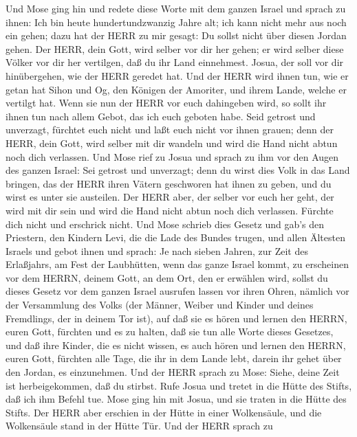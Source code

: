  Und Mose ging hin und redete diese Worte mit dem ganzen
Israel  und sprach zu ihnen: Ich bin heute hundertundzwanzig
Jahre alt; ich kann nicht mehr aus noch ein gehen; dazu hat der HERR zu
mir gesagt: Du sollst nicht über diesen Jordan gehen.  Der
HERR, dein Gott, wird selber vor dir her gehen; er wird selber diese
Völker vor dir her vertilgen, daß du ihr Land einnehmest. Josua, der
soll vor dir hinübergehen, wie der HERR geredet hat.  Und
der HERR wird ihnen tun, wie er getan hat Sihon und Og, den Königen der
Amoriter, und ihrem Lande, welche er vertilgt hat.  Wenn sie
nun der HERR vor euch dahingeben wird, so sollt ihr ihnen tun nach allem
Gebot, das ich euch geboten habe.  Seid getrost und
unverzagt, fürchtet euch nicht und laßt euch nicht vor ihnen grauen;
denn der HERR, dein Gott, wird selber mit dir wandeln und wird die Hand
nicht abtun noch dich verlassen.  Und Mose rief zu Josua und
sprach zu ihm vor den Augen des ganzen Israel: Sei getrost und
unverzagt; denn du wirst dies Volk in das Land bringen, das der HERR
ihren Vätern geschworen hat ihnen zu geben, und du wirst es unter sie
austeilen.  Der HERR aber, der selber vor euch her geht, der
wird mit dir sein und wird die Hand nicht abtun noch dich verlassen.
Fürchte dich nicht und erschrick nicht.  Und Mose schrieb
dies Gesetz und gab's den Priestern, den Kindern Levi, die die Lade des
Bundes trugen, und allen Ältesten Israels  und gebot ihnen
und sprach: Je nach sieben Jahren, zur Zeit des Erlaßjahrs, am Fest der
Laubhütten,  wenn das ganze Israel kommt, zu erscheinen vor
dem HERRN, deinem Gott, an dem Ort, den er erwählen wird, sollst du
dieses Gesetz vor dem ganzen Israel ausrufen lassen vor ihren Ohren,
 nämlich vor der Versammlung des Volks (der Männer, Weiber
und Kinder und deines Fremdlings, der in deinem Tor ist), auf daß sie es
hören und lernen den HERRN, euren Gott, fürchten und es zu halten, daß
sie tun alle Worte dieses Gesetzes,  und daß ihre Kinder,
die es nicht wissen, es auch hören und lernen den HERRN, euren Gott,
fürchten alle Tage, die ihr in dem Lande lebt, darein ihr gehet über den
Jordan, es einzunehmen.  Und der HERR sprach zu Mose:
Siehe, deine Zeit ist herbeigekommen, daß du stirbst. Rufe Josua und
tretet in die Hütte des Stifts, daß ich ihm Befehl tue. Mose ging hin
mit Josua, und sie traten in die Hütte des Stifts.  Der
HERR aber erschien in der Hütte in einer Wolkensäule, und die
Wolkensäule stand in der Hütte Tür.  Und der HERR sprach zu
